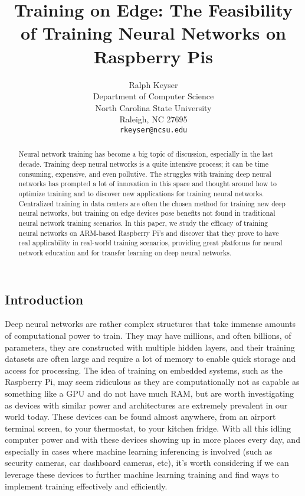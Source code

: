\documentclass{article}
\title{Training on Edge: The Feasibility of Training Neural Networks on Raspberry Pis\newline}
\author{%
  Ralph Keyser \\
  Department of Computer Science \\
  North Carolina State University \\
  Raleigh, NC 27695 \\
  \texttt{rkeyser@ncsu.edu} \\
}
\begin{document}
\maketitle
\begin{multicols}{2}



\begin{abstract}
Neural network training has become a big topic of discussion, especially in the last decade. Training deep neural networks is a quite intensive process; it can be time consuming, expensive, and even pollutive. The struggles with training deep neural networks has prompted a lot of innovation in this space and thought around how to optimize training and to discover new applications for training neural networks. Centralized training in data centers are often the chosen method for training new deep neural networks, but training on edge devices pose benefits not found in traditional neural network training scenarios. In this paper, we study the efficacy of training neural networks on ARM-based Raspberry Pi’s and discover that they prove to have real applicability in real-world training scenarios, providing great platforms for neural network education and for transfer learning on deep neural networks.
\end{abstract}

\section{Introduction}
\label{Introduction}

Deep neural networks are rather complex structures that take immense amounts of computational power to train. They may have millions, and often billions, of parameters, they are constructed with multiple hidden layers, and their training datasets are often large and require a lot of memory to enable quick storage and access for processing. The idea of training on embedded systems, such as the Raspberry Pi, may seem ridiculous as they are computationally not as capable as something like a GPU and do not have much RAM, but are worth investigating as devices with similar power and architectures are extremely prevalent in our world today. These devices can be found almost anywhere, from an airport terminal screen, to your thermostat, to your kitchen fridge. With all this idling computer power and with these devices showing up in more places every day, and especially in cases where machine learning inferencing is involved (such as security cameras, car dashboard cameras, etc), it’s worth considering if we can leverage these devices to further machine learning training and find ways to implement training effectively and efficiently.


\end{multicols}
\end{document}
